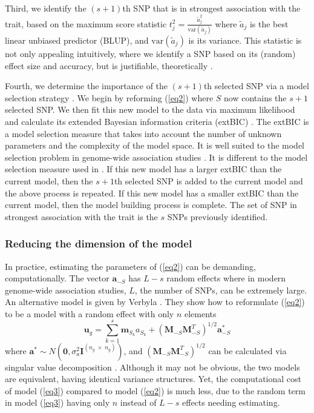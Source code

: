 \documentclass{bioinfo}
\newcommand{\bu}{\bm{u}}
\newcommand{\ba}{\bm{a}}
\newcommand{\bzero}{\bm{0}}
\newcommand{\bI}{\bm{I}}
\newcommand{\bM}{\bm{M}}
\newcommand{\bmm}{\bm{m}}
\begin{document}
Third, we identify the $(s+1)$th SNP that is in strongest association with the trait, based on the maximum score statistic
$t_j^2 = \frac{ \widetilde{a} _j^2}{\textrm{var}(\widetilde{a}_j)}$ where $\widetilde{a}_j$ is the best linear unbiased predictor (BLUP), 
and $\textrm{var}(\widetilde{a}_j)$ is its variance. This statistic is not only appealing intuitively, where we 
identify a SNP based on its (random) effect size and accuracy, but is justifiable, theoretically \citep{verbyla2012rwgaim}.

Fourth, we determine the importance of the $(s+1)$th selected SNP via a model selection strategy  \citep{verbyla2007analysis}. 
We begin by reforming (\ref{eq2}) where $S$ now contains the $s + 1$ selected SNP.  We then fit this new model to the data
via maximum likelihood and calculate its extended Bayesian information criteria (extBIC) \citep{chen2008extended}.  The 
extBIC is a model selection measure that takes into account the number of unknown parameters and the complexity 
of the model space.  It is well suited to the model selection problem in genome-wide association studies \citep{chen2008extended}. 
It is different to the model selection measure used in  \citep{verbyla2007analysis}.
If this new model has a larger extBIC than the current model, then the $s+1$th selected SNP is added to 
the current model and the above process is repeated. If this new model has a smaller extBIC than the current model, then the 
model building process is complete. The set of SNP in strongest association with the trait is the $s$ SNPs previously identified. 

\subsubsection {Reducing the dimension of the model} 

In practice, estimating the parameters of (\ref{eq2}) can be demanding, computationally. 
The vector $\ba_{-S}$ has $L-s$ random effects where in modern genome-wide association studies, 
$L$, the number of SNPs, can be extremely large.  An alternative model is given by 
Verbyla \citep{verbyla2012rwgaim,verbyla2014whole}. 
They show how to reformulate (\ref{eq2}) to be a model with a random effect with only $n$ elements
\begin{equation}
\label{eq3}
\bu_g = \sum_{k=1}^s  \bmm_{S_k} a_{S_k} + (\bM_{-S} \bM_{-S}^T)^{1/2} \ba^*_{-S}
\end{equation}
where $\ba^* \sim N(\bzero, \sigma_a^2 \bI^{(n_g \; \times \;  n_g)})$, and 
$(\bM_{-S} \bM_{-S}^T)^{1/2}$ can be calculated via singular value decomposition \citep{golub2012matrix}.  
Although it may not be obvious, the two models are equivalent, 
having identical variance structures. Yet, the computational cost of model (\ref{eq3}) compared to 
model (\ref{eq2}) is much less, due to the random term in model (\ref{eq3}) having only $n$ instead of $L-s$ 
effects needing estimating. 
\end{document}
